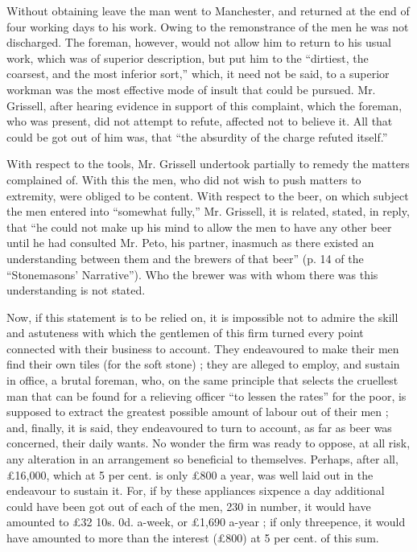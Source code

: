 Without obtaining leave the man went to Manchester, and returned at the
end of four working days to his work. Owing to the remonstrance of the
men he was not discharged. The foreman, however, would not allow him to
return to his usual work, which was of superior description, but put him
to the ``dirtiest, the coarsest, and the most inferior sort,'' which, it
need not be said, to a superior workman was the most effective mode of
insult that could be pursued. Mr. Grissell, after hearing evidence in
support of this complaint, which the foreman, who was present, did not
attempt to refute, affected not to believe it. All that could be got out
of him was, that ``the absurdity of the charge refuted itself.''

With respect to the tools, Mr. Grissell undertook partially to remedy
the matters complained of. With this the men, who did not wish to push
matters to extremity, were obliged to be content. With respect to the
beer, on which subject the men entered into ``somewhat fully,'' Mr.
Grissell, it is related, stated, in reply, that ``he could not make up
his mind to allow the men to have any other beer until he had consulted
Mr. Peto, his partner, inasmuch as there existed an understanding
between them and the brewers of that beer'' (p. 14 of the
``Stonemasons' Narrative''). Who the brewer was with whom there was
this understanding is not stated.

Now, if this statement is to be relied on, it is impossible not to
admire the skill and astuteness with which the gentlemen of this firm
turned every point connected with their business to account. They
endeavoured to make their men find their own tiles (for the soft stone)
; they are alleged to employ, and sustain in office, a brutal foreman,
who, on the same principle that selects the cruellest man that can be
found for a relieving officer ``to lessen the rates'' for the poor, is
supposed to extract the greatest possible amount of labour out of their
men ; and, finally, it is said, they endeavoured to turn to account, as
far as beer was concerned, their daily wants. No wonder the firm was
ready to oppose, at all risk, any alteration in an arrangement so
beneficial to themselves. Perhaps, after all, £16,000, which at 5 per
cent. is only £800 a year, was well laid out in the endeavour to sustain
it. For, if by these appliances sixpence a day additional could have
been got out of each of the men, 230 in number, it would have amounted
to £32 10s. 0d. a-week, or £1,690 a-year ; if only threepence, it would
have amounted to more than the interest (£800) at 5 per cent. of this
sum.

